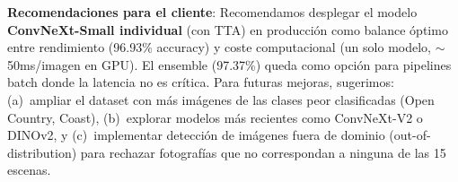\documentclass[10pt,a4paper,twocolumn]{article}
\begin{document}
\textbf{Recomendaciones para el cliente}: Recomendamos desplegar el modelo \textbf{ConvNeXt-Small individual} (con TTA) en producción como balance óptimo entre rendimiento (96.93\% accuracy) y coste computacional (un solo modelo, $\sim$50ms/imagen en GPU). El ensemble (97.37\%) queda como opción para pipelines batch donde la latencia no es crítica. Para futuras mejoras, sugerimos: (a)~ampliar el dataset con más imágenes de las clases peor clasificadas (Open Country, Coast), (b)~explorar modelos más recientes como ConvNeXt-V2 o DINOv2, y (c)~implementar detección de imágenes fuera de dominio (out-of-distribution) para rechazar fotografías que no correspondan a ninguna de las 15 escenas.
\end{document}
